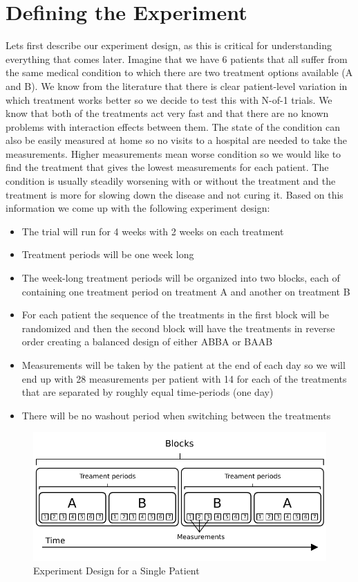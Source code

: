 \documentclass[12pt,a4paper,leqno]{report}
\theoremstyle{plain}
\theoremstyle{definition}
\theoremstyle{remark}
\begin{document}
\section{Defining the Experiment}

Lets first describe our experiment design, as this is critical for understanding
everything that comes later. Imagine that we have 6 patients that all suffer from the
same medical condition to which there are two treatment options available (A and
B). We know from the
literature that there is clear patient-level variation in which treatment works better
so we decide to test this with N-of-1 trials. We know that both of the treatments act
very fast and that there are no known problems with interaction effects between them.
The state of the condition can also be easily measured at home so no visits to
a hospital are needed to take the measurements. Higher measurements mean worse condition
so we would like to find the treatment that gives the lowest measurements for each
patient. The condition is usually steadily
worsening with or without the treatment and the treatment is more for slowing down the
disease and not curing it. Based on this information we come up with the following experiment design:

\begin{itemize}
    \item The trial will run for 4 weeks with 2 weeks on each treatment
    \item Treatment periods will be one week long
    \item The week-long treatment periods will be organized into two blocks, each of
    containing one treatment period on treatment A and another on treatment B
    \item For each patient the sequence of the treatments in the first block will be randomized and then
    the second block will have the treatments in reverse order creating a balanced
    design of either ABBA or BAAB
    \item Measurements will be taken by the patient at the end of each day so we will end up with
    28 measurements per patient with 14 for each of the treatments that are separated by
    roughly equal time-periods (one day)
    \item There will be no washout period when switching between the treatments
\end{itemize}

\begin{figure}[H]
    \centering
    \caption{Experiment Design for a Single Patient}\label{singlepatientexperimentdesign}
    \includegraphics{design_for_simulated_experiment.pdf}
\end{figure}
\end{document}
